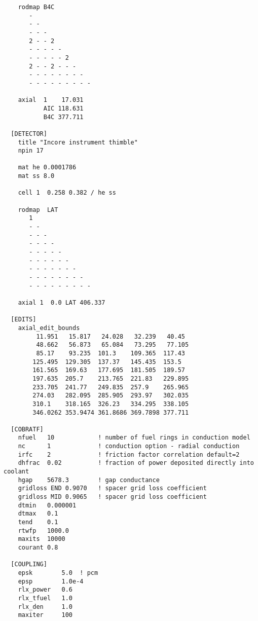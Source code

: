 \begin{verbatim}
    rodmap B4C
       -
       - -
       - - -
       2 - - 2
       - - - - -
       - - - - - 2
       2 - - 2 - - -
       - - - - - - - -
       - - - - - - - - -

    axial  1    17.031
           AIC 118.631
           B4C 377.711

  [DETECTOR]
    title "Incore instrument thimble"
    npin 17

    mat he 0.0001786
    mat ss 8.0

    cell 1  0.258 0.382 / he ss

    rodmap  LAT
       1
       - -
       - - -
       - - - -
       - - - - -
       - - - - - -
       - - - - - - -
       - - - - - - - -
       - - - - - - - - -

    axial 1  0.0 LAT 406.337

  [EDITS]
    axial_edit_bounds
         11.951   15.817   24.028   32.239   40.45
         48.662   56.873   65.084   73.295   77.105
         85.17    93.235  101.3    109.365  117.43
        125.495  129.305  137.37   145.435  153.5
        161.565  169.63   177.695  181.505  189.57
        197.635  205.7    213.765  221.83   229.895
        233.705  241.77   249.835  257.9    265.965
        274.03   282.095  285.905  293.97   302.035
        310.1    318.165  326.23   334.295  338.105
        346.0262 353.9474 361.8686 369.7898 377.711

  [COBRATF]
    nfuel   10            ! number of fuel rings in conduction model
    nc      1             ! conduction option - radial conduction
    irfc    2             ! friction factor correlation default=2
    dhfrac  0.02          ! fraction of power deposited directly into coolant
    hgap    5678.3        ! gap conductance
    gridloss END 0.9070   ! spacer grid loss coefficient
    gridloss MID 0.9065   ! spacer grid loss coefficient
    dtmin   0.000001
    dtmax   0.1
    tend    0.1
    rtwfp   1000.0
    maxits  10000
    courant 0.8

  [COUPLING]
    epsk        5.0  ! pcm
    epsp        1.0e-4
    rlx_power   0.6
    rlx_tfuel   1.0
    rlx_den     1.0
    maxiter     100

\end{verbatim}


